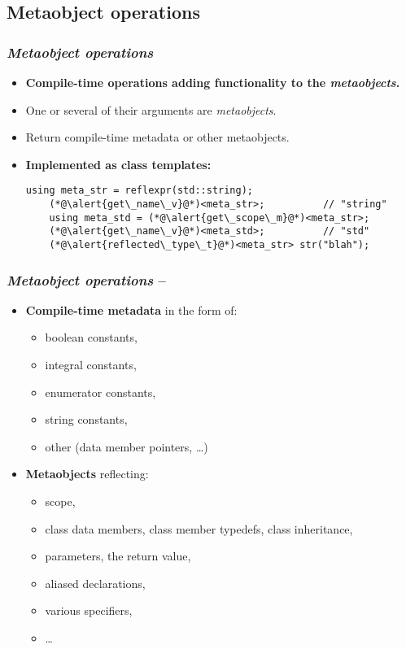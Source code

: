 \documentclass[compress,table,xcolor=table]{beamer}
\begin{document}
\subsection{Metaobject operations}
\begin{frame}[fragile]
\frametitle{{\em Metaobject operations}}
  \large
  \begin{itemize}
    \item \textbf{Compile-time operations adding functionality to the {\em metaobjects}.}
    \item One or several of their arguments are {\em metaobjects}.
    \item Return compile-time metadata or other metaobjects.
    \item {\Large \textbf{Implemented as class templates:}}
    \begin{lstlisting}[basicstyle=\normalsize\ttfamily]
	using meta_str = reflexpr(std::string);
	(*@\alert{get\_name\_v}@*)<meta_str>;          // "string"
	using meta_std = (*@\alert{get\_scope\_m}@*)<meta_str>;
	(*@\alert{get\_name\_v}@*)<meta_std>;          // "std"
	(*@\alert{reflected\_type\_t}@*)<meta_str> str("blah");
    \end{lstlisting}
  \end{itemize}
\end{frame}

\begin{frame}
\frametitle{{\em Metaobject operations} -- }
  \large
  \begin{itemize}
    \item \textbf{Compile-time metadata} in the form of:
    \begin{itemize}
      \normalsize
      \item boolean constants,
      \item integral constants,
      \item enumerator constants,
      \item string constants,
      \item other (data member pointers, \ldots)
    \end{itemize}
    \item \textbf{Metaobjects} reflecting:
    \begin{itemize}
      \normalsize
      \item scope,
      \item class data members, class member typedefs, class inheritance,
      \item parameters, the return value,
      \item aliased declarations,
      \item various specifiers,
      \item \ldots
    \end{itemize}
  \end{itemize}
\end{frame}
\end{document}
